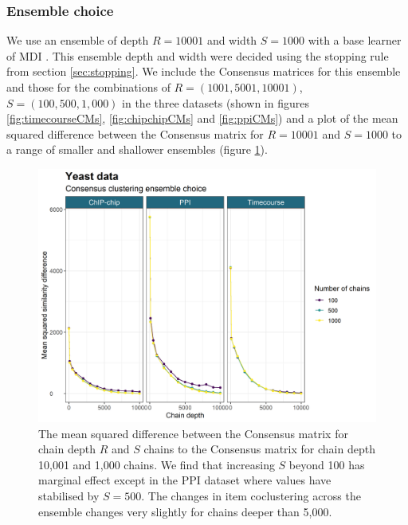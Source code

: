 \documentclass[]{article}
\begin{document}
\subsubsection{Ensemble choice}
We use an ensemble of depth $R=10001$ and width $S=1000$ with a base learner of MDI \citep[using the software implementation from][]{mason2016mdi}. This ensemble depth and width were decided using the stopping rule from section \ref{sec:stopping}. We include the Consensus matrices for this ensemble and those for the combinations of $R = (1001, 5001, 10001)$, $S=(100, 500, 1,000)$ in the three datasets (shown in figures \ref{fig:timecourseCMs}, \ref{fig:chipchipCMs} and \ref{fig:ppiCMs}) and a plot of the mean squared difference between the Consensus matrix for $R=10001$ and $S=1000$ to a range of smaller and shallower ensembles (figure \ref{fig:ensembleChoice}).

\begin{figure}
	\centering
	\includegraphics[scale=0.6]{./Images/Yeast/EnsembleChoicePlot.png}
	\caption{The mean squared difference between the Consensus matrix for chain depth $R$ and $S$ chains to the Consensus matrix for chain depth 10,001 and 1,000 chains. We find that increasing $S$ beyond 100 has marginal effect except in the PPI dataset where values have stabilised by $S=500$. The changes in item coclustering across the ensemble changes very slightly for chains deeper than 5,000.}
	\label{fig:ensembleChoice}
\end{figure}

\end{document}
